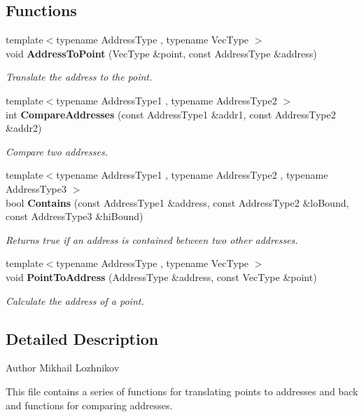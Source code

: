 \subsection*{Functions}
\begin{DoxyCompactItemize}
\item 
{\footnotesize template$<$typename Address\+Type , typename Vec\+Type $>$ }\\void \textbf{ Address\+To\+Point} (Vec\+Type \&point, const Address\+Type \&address)
\begin{DoxyCompactList}\small\item\em Translate the address to the point. \end{DoxyCompactList}\item 
{\footnotesize template$<$typename Address\+Type1 , typename Address\+Type2 $>$ }\\int \textbf{ Compare\+Addresses} (const Address\+Type1 \&addr1, const Address\+Type2 \&addr2)
\begin{DoxyCompactList}\small\item\em Compare two addresses. \end{DoxyCompactList}\item 
{\footnotesize template$<$typename Address\+Type1 , typename Address\+Type2 , typename Address\+Type3 $>$ }\\bool \textbf{ Contains} (const Address\+Type1 \&address, const Address\+Type2 \&lo\+Bound, const Address\+Type3 \&hi\+Bound)
\begin{DoxyCompactList}\small\item\em Returns true if an address is contained between two other addresses. \end{DoxyCompactList}\item 
{\footnotesize template$<$typename Address\+Type , typename Vec\+Type $>$ }\\void \textbf{ Point\+To\+Address} (Address\+Type \&address, const Vec\+Type \&point)
\begin{DoxyCompactList}\small\item\em Calculate the address of a point. \end{DoxyCompactList}\end{DoxyCompactItemize}


\subsection{Detailed Description}
\begin{DoxyAuthor}{Author}
Mikhail Lozhnikov
\end{DoxyAuthor}
This file contains a series of functions for translating points to addresses and back and functions for comparing addresses.

